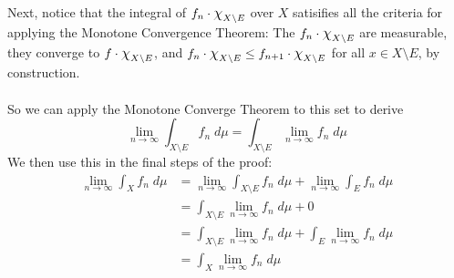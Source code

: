 \documentclass[12pt]{article}
\theoremstyle{plain}
\theoremstyle{definition}
\theoremstyle{remark}
\newcommand*{\Chi}{\mbox{\large$\chi$}} %
\begin{document}
\begin{enumerate}
\begin{enumerate}
Next, notice that the integral of $f_n\cdot\Chi_{X\setminus E}$ over $X$ satisifies all the criteria for applying the Monotone Convergence Theorem: The $f_n\cdot\Chi_{X\setminus E}$ are measurable, they converge to $f\cdot\Chi_{X\setminus E}$, and $f_n\cdot\Chi_{X\setminus E}\leq f_{n+1}\cdot\Chi_{X\setminus E}$ for all $x\in X\setminus E$, by construction. 
\\
\\
So we can apply the Monotone Converge Theorem to this set to derive
\[
    \lim_{n\rightarrow\infty}\int_{X\setminus E} f_n \; d\mu=
    \int_{X\setminus E} \lim_{n\rightarrow\infty}f_n \; d\mu
\]
We then use this in the final steps of the proof:
\begin{align*}
    \lim_{n\rightarrow\infty}\int_{X} f_n \; d\mu&=
    \lim_{n\rightarrow\infty}\int_{X\setminus E} f_n \; d\mu
    +
    \lim_{n\rightarrow\infty}\int_{E} f_n \; d\mu \\
    &= 
    \int_{X\setminus E} \lim_{n\rightarrow\infty}f_n \; d\mu
    + 0 \\
    &= 
    \int_{X\setminus E} \lim_{n\rightarrow\infty}f_n \; d\mu
    + \int_{E} \lim_{n\rightarrow\infty}f_n \; d\mu\\
    &= \int_{X} \lim_{n\rightarrow\infty}f_n \; d\mu
\end{align*}


\end{enumerate}
\end{enumerate}
\end{document}
